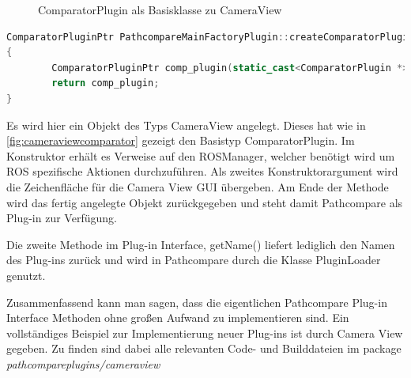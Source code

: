  \begin{figure}[t]
   \begin{center}
   \end{center}
   \caption{ComparatorPlugin als Basisklasse zu CameraView}
   \label{fig:cameraviewcomparator}
 \end{figure}

\begin{lstlisting}[caption=Implementierung der createComparatorPlugin in Camera View, language=C++, basicstyle=\footnotesize, label=lst:create]
ComparatorPluginPtr PathcompareMainFactoryPlugin::createComparatorPlugin(ROSManager * ros_manager, QWidget *tab_widget) const
{
        ComparatorPluginPtr comp_plugin(static_cast<ComparatorPlugin *>(new CameraView(ros_manager, tab_widget)));
        return comp_plugin;
}
\end{lstlisting}

Es wird hier ein Objekt des Typs CameraView angelegt. Dieses
hat wie in \autoref{fig:cameraviewcomparator} gezeigt den Basistyp ComparatorPlugin. Im
Konstruktor erhält es Verweise auf den ROSManager, welcher benötigt wird um ROS
spezifische Aktionen durchzuführen. Als zweites Konstruktorargument wird die
Zeichenfläche für die Camera View GUI übergeben. Am Ende der Methode wird das
fertig angelegte Objekt zurückgegeben und steht damit Pathcompare als Plug-in zur
Verfügung. 

Die zweite Methode im Plug-in Interface, getName() liefert lediglich den Namen
des Plug-ins zurück und wird in Pathcompare durch die Klasse PluginLoader
genutzt.

Zusammenfassend kann man sagen, dass die eigentlichen Pathcompare Plug-in Interface
Methoden ohne großen Aufwand zu implementieren sind. Ein vollständiges
Beispiel zur Implementierung neuer Plug-ins ist durch Camera View gegeben.
Zu finden sind dabei alle relevanten Code- und Builddateien im package 
\textit{pathcompareplugins/cameraview}

